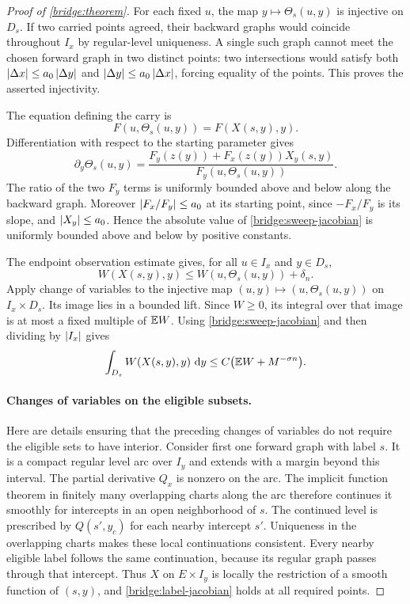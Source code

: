 \begin{proof}[Proof of \cref{bridge:theorem}]
For each fixed $u$, the map $y\mapsto\Theta_s(u,y)$ is injective on
$D_s$. If two carried points agreed, their backward graphs would
coincide throughout $I_x$ by regular-level uniqueness. A single such
graph cannot meet the chosen forward graph in two distinct points:
two intersections would satisfy both
$\left\lvert\Delta x\right\rvert\leq a_0\left\lvert\Delta y\right\rvert$ and
$\left\lvert\Delta y\right\rvert\leq a_0\left\lvert\Delta x\right\rvert$, forcing equality of the
points. This proves the asserted injectivity.

The equation defining the carry is
\[
 F(u,\Theta_s(u,y))=F(X(s,y),y).
\]
Differentiation with respect to the starting parameter gives
\begin{equation}
 \partial_y\Theta_s(u,y)
 =\frac{F_y(z(y))+F_x(z(y))X_y(s,y)}
        {F_y(u,\Theta_s(u,y))}.
 \label{bridge:sweep-jacobian}
\end{equation}
The ratio of the two $F_y$ terms is uniformly bounded above and
below along the backward graph. Moreover $\left\lvert F_x/F_y\right\rvert\leq a_0$
at its starting point, since $-F_x/F_y$ is its slope, and
$\left\lvert X_y\right\rvert\leq a_0$. Hence the absolute value of
\cref{bridge:sweep-jacobian} is uniformly bounded above and below
by positive constants.

The endpoint observation estimate gives, for all $u\in I_x$ and
$y\in D_s$,
\[
 W(X(s,y),y)\leq W(u,\Theta_s(u,y))+\delta_n.
\]
Apply change of variables to the injective map
$(u,y)\mapsto(u,\Theta_s(u,y))$ on $I_x\times D_s$.
Its image lies in a bounded lift. Since $W\geq0$, its integral over
that image is at most a fixed multiple of $\mathbb{E} W$. Using
\cref{bridge:sweep-jacobian} and then dividing by $\left\lvert I_x\right\rvert$ gives
\begin{equation}
 \int_{D_s}W(X(s,y),y)\,\,\mathrm{d} y
 \leq C\bigl(\mathbb{E} W+M^{-\sigma n}\bigr).
 \label{bridge:conditional-weight}
\end{equation}

\paragraph{Changes of variables on the eligible subsets.}
Here are details ensuring that the preceding changes of variables
do not require the eligible sets to have interior. Consider first
one forward graph with label $s$. It is a compact regular level arc
over $I_y$ and extends with a margin beyond this interval. The
partial derivative $Q_x$ is nonzero on the arc. The implicit
function theorem in finitely many overlapping charts along the arc
therefore continues it smoothly for intercepts in an open
neighborhood of $s$. The continued level is prescribed by
$Q(s',y_c)$ for each nearby intercept $s'$. Uniqueness in the
overlapping charts makes these local continuations consistent.
Every nearby eligible label follows the same continuation, because
its regular graph passes through that intercept. Thus $X$ on
$E\times I_y$ is locally the restriction of a smooth function of
$(s,y)$, and \cref{bridge:label-jacobian} holds at all required
points.


\end{proof}
